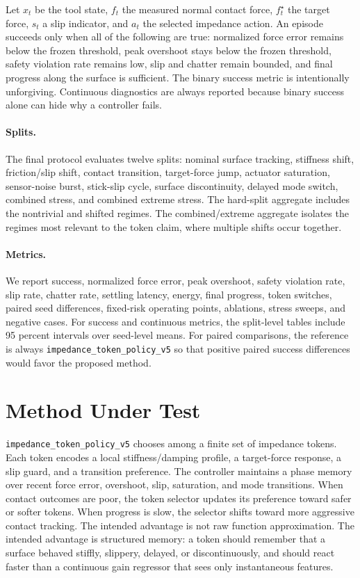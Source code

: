 \documentclass{article}
\newcommand{\vfivemethod}{\texttt{impedance\_token\_policy\_v5}}
\begin{document}
Let $x_t$ be the tool state, $f_t$ the measured normal contact force, $f_t^\star$ the target force, $s_t$ a slip indicator, and $a_t$ the selected impedance action.
An episode succeeds only when all of the following are true:
normalized force error remains below the frozen threshold,
peak overshoot stays below the frozen threshold,
safety violation rate remains low,
slip and chatter remain bounded,
and final progress along the surface is sufficient.
The binary success metric is intentionally unforgiving.
Continuous diagnostics are always reported because binary success alone can hide why a controller fails.

\paragraph{Splits.}
The final protocol evaluates twelve splits:
nominal surface tracking, stiffness shift, friction/slip shift, contact transition, target-force jump, actuator saturation, sensor-noise burst, stick-slip cycle, surface discontinuity, delayed mode switch, combined stress, and combined extreme stress.
The hard-split aggregate includes the nontrivial and shifted regimes.
The combined/extreme aggregate isolates the regimes most relevant to the token claim, where multiple shifts occur together.

\paragraph{Metrics.}
We report success, normalized force error, peak overshoot, safety violation rate, slip rate, chatter rate, settling latency, energy, final progress, token switches, paired seed differences, fixed-risk operating points, ablations, stress sweeps, and negative cases.
For success and continuous metrics, the split-level tables include 95 percent intervals over seed-level means.
For paired comparisons, the reference is always \vfivemethod{} so that positive paired success differences would favor the proposed method.

\section{Method Under Test}
\vfivemethod{} chooses among a finite set of impedance tokens.
Each token encodes a local stiffness/damping profile, a target-force response, a slip guard, and a transition preference.
The controller maintains a phase memory over recent force error, overshoot, slip, saturation, and mode transitions.
When contact outcomes are poor, the token selector updates its preference toward safer or softer tokens.
When progress is slow, the selector shifts toward more aggressive contact tracking.
The intended advantage is not raw function approximation.
The intended advantage is structured memory: a token should remember that a surface behaved stiffly, slippery, delayed, or discontinuously, and should react faster than a continuous gain regressor that sees only instantaneous features.
\end{document}
